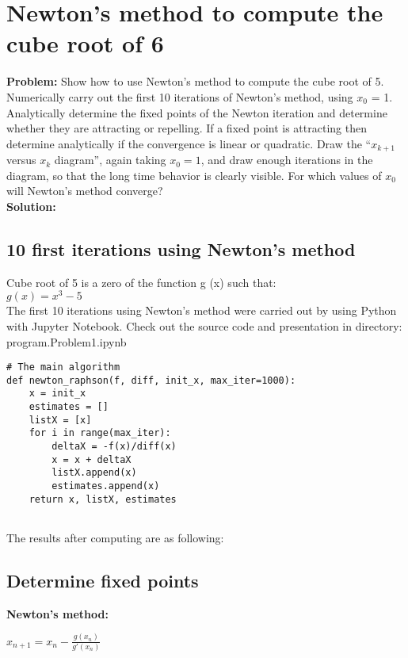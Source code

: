 \newpage
\section{Newton's method to compute the cube root of 6}
\label{sec:newton_s_method_to_compute_the_cube_root_of_6}

\textbf{Problem:}
Show how to use Newton’s method to compute the cube root
of 5. Numerically carry out the first 10 iterations of Newton’s method, using $x_{0}$ = 1. 
Analytically determine the fixed points of the Newton iteration and determine whether they are attracting or repelling.
If a fixed point is attracting then determine analytically if the convergence is linear or quadratic.
Draw the “$x_{k+1}$ versus $x_{k}$ diagram”, again taking $x_{0} = 1$, and draw enough iterations in the diagram, so that the long time behavior is clearly visible. 
For which values of $x_{0}$ will Newton’s method converge?
\\
\textbf{Solution:}
\subsection{10 first iterations using Newton's method}
\label{10iterations}
Cube root of 5 is a zero of the function g (x) such that:\\
$g(x) = x^{3} - 5$\\

The first 10 iterations using Newton's method were carried out by using Python with Jupyter Notebook. Check out the source code and presentation in directory: program.Problem1.ipynb 

\begin{lstlisting}
# The main algorithm
def newton_raphson(f, diff, init_x, max_iter=1000):
    x = init_x
    estimates = []
    listX = [x]
    for i in range(max_iter):
        deltaX = -f(x)/diff(x)
        x = x + deltaX
        listX.append(x)
        estimates.append(x)
    return x, listX, estimates
    
\end{lstlisting}

The results after computing are as following:
\begin{quote}

\end{quote}

\subsection{Determine fixed points}
\label{Fixed point finding}
\textbf{Newton's method:}
\begin{centering}
    $x_{n+1} = x_{n} - \frac{g(x_{n})}{g'(x_{n})}$
\end{centering}

